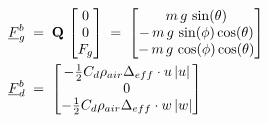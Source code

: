 \begin{align}
	\underline{F}_{g}^{b}\;&=\;\textbf{Q}\,\begin{bmatrix}0\\0\\F_{g}\end{bmatrix}\;=\;
	\begin{bmatrix}m\,g\,\sin(\theta)\\
	-\,m\,g\,\sin(\phi)\cos(\theta)\\
	-\,m\,g\,\cos(\phi)\cos(\theta)
	\end{bmatrix}\\
	\underline{F}_{d}^{b}\;&=\;\begin{bmatrix}
	-\frac{1}{2}C_d\rho_{air}\Delta_{eff}\cdot u\,\lvert u\rvert\\0\\
	-\frac{1}{2}C_d\rho_{air}\Delta_{eff}\cdot w\,\lvert w\rvert\end{bmatrix}
\end{align}

